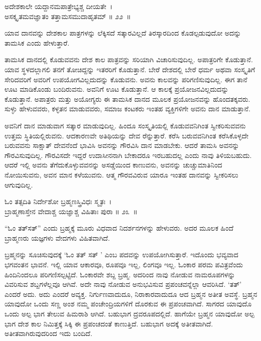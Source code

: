 \begin{shloka}
ಅದೇಶಕಾಲೇ ಯದ್ದಾನಮಪಾತ್ರೇಭ್ಯಶ್ಚ ದೀಯತೇ~।\\ಅಸಕ್ಕೃತಮವಜ್ಞಾತಂ ತತ್ತಾಮಸಮುದಾಹೃತಮ್ \hfill॥ ೨೨~॥
\end{shloka}

\begin{artha}
ಯಾವ ದಾನವನ್ನು ದೇಶಕಾಲ ಪಾತ್ರಗಳನ್ನು ಲೆಕ್ಕಿಸದೆ ಸತ್ಕಾರವಿಲ್ಲದೆ ತಿರಸ್ಕಾರದಿಂದ ಕೊಡಲ್ಪಡು\-ವುದೋ ಅದನ್ನು ತಾಮಸಿಕ ಎಂದು ಹೇಳುತ್ತಾರೆ.
\end{artha}

ತಾಮಸಿಕ ದಾನದಲ್ಲಿ ಕೊಡುವವನು ದೇಶ ಕಾಲ ಪಾತ್ರವನ್ನು ಸರಿಯಾಗಿ ವಿಚಾರಿಸುವುದಿಲ್ಲ. ಅಪಾತ್ರರಿಗೇ ಕೊಡುತ್ತಾನೆ. ಯಾವ ಸ್ಥಳದಲ್ಲಾಗಲಿ ತನಗೆ ತೋಚಿದ್ದನ್ನು ಇತರರಿಗೆ ಕೊಡುತ್ತಾನೆ. ಬೇರೆ ದೇಶದಲ್ಲಿ ಬೇರೆ ಧರ್ಮ ಅಥವಾ ಸಂಸ್ಕೃತಿಗೆ ಸೇರಿದವರಿಗೆ ಅವರಿಗೆ ಉಪಯೋಗವಿಲ್ಲದುದನ್ನು ಕೊಡುವನು. ಅವನು ಕಾಲವನ್ನು ಪರಿಗಣಿಸುವುದಿಲ್ಲ. ಈಗ ತಾನೆ ಊಟ ಮಾಡಿಕೊಂಡು ಬಂದಿರುವನು. ಅವನಿಗೆ ಊಟ ಕೊಡುತ್ತಾನೆ. ಆ ಕಾಲಕ್ಕೆ ಪ್ರಯೋಜನವಿಲ್ಲದುದನ್ನು ಕೊಡುತ್ತಾನೆ. ಅಪಾತ್ರರು ಮತ್ತು ಅಯೋಗ್ಯರು ಈ ತಾಮಸಿಕ ದಾನದ ಮೂಲಕ ಪ್ರಯೋಜನವನ್ನು ಹೊಂದತಕ್ಕವರು. ಸುಳ್ಳು ಹೇಳುವವರು, ಕಳ್ಳತನ ಮಾಡುವವರು, ಸಮಾಜ ಕಂಟಕರು ಇಂತಹ ವ್ಯಕ್ತಿಗಳಿಗೇ ಅವನು ದಾನ ಮಾಡುತ್ತಾನೆ.

ಅವನಿಗೆ ದಾನ ಮಾಡುವಾಗ ಸತ್ಕಾರ ಮಾಡುವುದಿಲ್ಲ. ಹಿಂದೂ ಸಂಸ್ಕೃತಿಯಲ್ಲಿ ಕೊಡುವವನಿಗಿಂತ ಸ್ವೀಕರಿಸುವವನು ಉತ್ತಮ ಸ್ಥಿತಿಯಲ್ಲಿರುವನು. ಆದಕಾರಣವೇ ಅತಿಥಿಯನ್ನು ದೇವ ರೆನ್ನುತ್ತಾರೆ. ಕರೆಸಿ ಬರುವವನಿಗಿಂತ ಕರೆಸಿಕೊಳ್ಳದೇ ಬರುವವನು ಸಾಕ್ಷಾತ್ ದೇವನೆಂದೆ ಭಾವಿಸಿ ಅವನನ್ನು ಗೌರವಿಸಿ ದಾನ ಮಾಡಬೇಕು. ಆದರೆ ತಾಮಸಿ ಅವನನ್ನು ಗೌರವಿಸುವುದಿಲ್ಲ. ಗೌರವಿಸದೇ ಇದ್ದರೆ ಉದಾಸೀನನಾಗಿ ಬೇಕಾದರೂ ಇರಬಹುದಲ್ಲ ಎಂದು ನಾವು ತಿಳಿಯಬಹುದು. ಆದರೆ ಇಲ್ಲಿ ಅವನು ತೆಗೆದುಕೊಳ್ಳುವವನನ್ನು ಅಸಡ್ಡೆಯಿಂದ ಕಾಣುವನು, ಅವನನ್ನು ಚುಚ್ಚುಮಾತಿನಿಂದ ನೋಯಿಸುವನು, ಅವನ ಮಾನ ಕಳೆಯುವನು. ಆತ್ಮ ಗೌರವವಿರುವ ಯಾರೂ ಇಂತಹ ದಾನವನ್ನು ಸ್ವೀಕರಿಸಲು ಆಗುವುದಿಲ್ಲ.

\begin{shloka}
ಓಂ ತತ್ಸದಿತಿ ನಿರ್ದೇಶೋ ಬ್ರಹ್ಮಣಸ್ತ್ರಿವಿಧಃ ಸ್ಮೃತಃ~।\\ಬ್ರಾಹ್ಮಣಾಸ್ತೇನ ವೇದಾಶ್ಚ ಯಜ್ಞಾಶ್ಚ ವಿಹಿತಾಃ ಪುರಾ \hfill॥ ೨೩~॥
\end{shloka}

\begin{artha}
“ಓಂ ತತ್​ಸತ್​” ಎಂದು ಬ್ರಹ್ಮಕ್ಕೆ ಮೂರು ವಿಧವಾದ ನಿದರ್ಶನಗಳನ್ನು ಹೇಳುವರು. ಅದರ ಮೂಲಕ ಹಿಂದೆ ಬ್ರಾಹ್ಮಣರು ಯಜ್ಞಗಳು ವೇದಗಳು ವಿಹಿತವಾಗಿದೆ.
\end{artha}

ಬ್ರಹ್ಮನನ್ನು ಸೂಚಿಸುವುದಕ್ಕೆ ‘ಓಂ ತತ್ ಸತ್ ’ ಎಂಬ ಪದವನ್ನು ಉಪಯೋಗಿಸುತ್ತಾರೆ. ಇದೊಂದು ಭವ್ಯವಾದ ಭಗವಂತನ ಭಾವನೆ. ಇಲ್ಲಿ ಯಾವ ಆಕಾರವೂ, ರೂಪವೂ ಇಲ್ಲ, ಲಿಂಗವೂ ಇಲ್ಲ. ಓಂಕಾರ ಪರಮ ಪವಿತ್ರವೆಂದು ಹಿಂದಿನಿಂದಲೂ ಪರಿಗಣಿಸಲ್ಪಟ್ಟಿದೆ. ಓಂಕಾರವೇ ಶಬ್ದ ಬ್ರಹ್ಮ. ಅದರಿಂದ ನಾವು ನೋಡುವ ನಾಮರೂಪಗಳನ್ನು ವಿವರಿಸುವ ಶಬ್ದಗಳೆಲ್ಲವೂ ಆಗಿವೆ. ಅದೇ ನಾವು ನೋಡುವ ಅನುಭವಿಸುವ ಪ್ರಪಂಚವನ್ನೆಲ್ಲಾ ಆವರಿಸಿದೆ. ‘ತತ್​’ ಎಂದರೆ ಅದು. ಅದು ಎಂದರೆ ಅವ್ಯಕ್ತ. ನಿರ್ಗುಣವಾದುದೂ, ನಿರಾಕಾರವಾದುದೂ ಆದ ಬ್ರಹ್ಮನ ಅತೀತ ಅವಸ್ಥೆ. ಬ್ರಹ್ಮನ ಯಾವುದೋ ಒಂದು ಸಣ್ಣ ಅಂಶ ನಮ್ಮ ಪಂಚೇಂದ್ರಿಯಗಳಿಗೆ ದೊರಕುವ ಈ ಪ್ರಪಂಚವಾಗಿದೆ. ಸಾಗರದ ಯಾವುದೊ ಒಂದು ಅಲ್ಪ ಭಾಗ ತೇಲುವ ಹಿಮರಾಶಿ ಆಗಿದೆ. ಬಹುಭಾಗ ದ್ರವರೂಪದಲ್ಲಿದೆ. ಹಾಗೆಯೇ ಬ್ರಹ್ಮನ ಯಾವುದೋ ಅಲ್ಪ ಭಾಗ ದೇಶ ಕಾಲ ನಿಮಿತ್ತಕ್ಕೆ ಸಿಕ್ಕಿ ಈ ಪ್ರಪಂಚದಂತೆ ಕಾಣುತ್ತಿದೆ. ಬಹುಭಾಗ ಅದಕ್ಕೆ ಅತೀತವಾಗಿದೆ. ಅತೀತವಾಗಿರುವುದರಿಂದ ಇದು ಬಂದಿದೆ.

